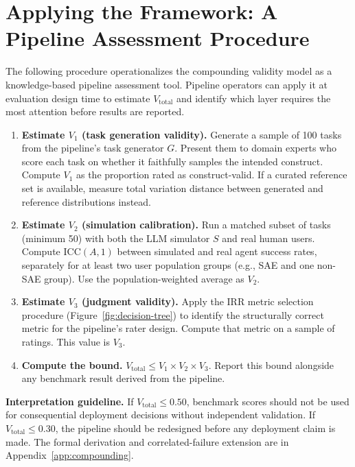\documentclass[preprint,12pt]{elsarticle}
\newcommand{\vtot}{V_{\text{total}}}
\begin{document}
\section{Applying the Framework: A Pipeline Assessment Procedure}
\label{sec:applying}

The following procedure operationalizes the compounding validity model as a
knowledge-based pipeline assessment tool. Pipeline operators can apply it at
evaluation design time to estimate $\vtot$ and identify which layer requires the most
attention before results are reported.

\begin{enumerate}

\item \textbf{Estimate $V_1$ (task generation validity).} Generate a sample of 100
  tasks from the pipeline's task generator $G$. Present them to domain experts who
  score each task on whether it faithfully samples the intended construct. Compute
  $V_1$ as the proportion rated as construct-valid. If a curated reference set is
  available, measure total variation distance between generated and reference
  distributions instead.

\item \textbf{Estimate $V_2$ (simulation calibration).} Run a matched subset of
  tasks (minimum 50) with both the LLM simulator $S$ and real human users. Compute
  $\mathrm{ICC}(A,1)$ between simulated and real agent success rates, separately for
  at least two user population groups (e.g., SAE and one non-SAE group). Use the
  population-weighted average as $V_2$.

\item \textbf{Estimate $V_3$ (judgment validity).} Apply the IRR metric selection
  procedure (Figure~\ref{fig:decision-tree}) to identify the structurally correct
  metric for the pipeline's rater design. Compute that metric on a sample of ratings.
  This value is $V_3$.

\item \textbf{Compute the bound.} $\vtot \leq V_1 \times V_2 \times V_3$. Report
  this bound alongside any benchmark result derived from the pipeline.

\end{enumerate}

\noindent\textbf{Interpretation guideline.} If $\vtot \leq 0.50$, benchmark scores
should not be used for consequential deployment decisions without independent
validation. If $\vtot \leq 0.30$, the pipeline should be redesigned before any
deployment claim is made. The formal derivation and correlated-failure extension
are in Appendix~\ref{app:compounding}.
\end{document}
